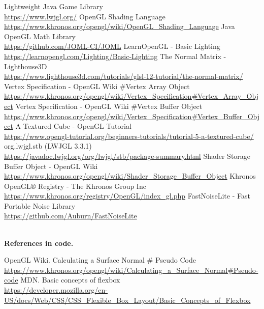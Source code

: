 \documentclass{article}
\begin{document}
    \begin{thebibliography}{9}
        
        Lightweight Java Game Library \\
        \url{https://www.lwjgl.org/}
        OpenGL Shading Language \\
        \url{https://www.khronos.org/opengl/wiki/OpenGL_Shading_Language}
        Java OpenGL Math Library \\
        \url{https://github.com/JOML-CI/JOML}
        LearnOpenGL - Basic Lighting \\
        \url{https://learnopengl.com/Lighting/Basic-Lighting}
        The Normal Matrix - Lighthouse3D \\
        \url{https://www.lighthouse3d.com/tutorials/glsl-12-tutorial/the-normal-matrix/}
        Vertex Specification - OpenGL Wiki \#Vertex Array Object \\
        \url{https://www.khronos.org/opengl/wiki/Vertex_Specification#Vertex_Array_Object}
        Vertex Specification - OpenGL Wiki \#Vertex Buffer Object \\
        \url{https://www.khronos.org/opengl/wiki/Vertex_Specification#Vertex_Buffer_Object}
        A Textured Cube - OpenGL Tutorial \\
        \url{https://www.opengl-tutorial.org/beginners-tutorials/tutorial-5-a-textured-cube/}
        org.lwjgl.stb (LWJGL 3.3.1) \\
        \url{https://javadoc.lwjgl.org/org/lwjgl/stb/package-summary.html}
        Shader Storage Buffer Object - OpenGL Wiki \\
        \url{https://www.khronos.org/opengl/wiki/Shader_Storage_Buffer_Object}
        Khronos OpenGL® Registry - The Khronos Group Inc \\
        \url{https://www.khronos.org/registry/OpenGL/index_gl.php}
        FastNoiseLite - Fast Portable Noise Library\\
        \url{https://github.com/Auburn/FastNoiseLite}

        \textbf{\\ References in code.}

         OpenGL Wiki. Calculating a Surface Normal \# Pseudo Code \\
        \url{https://www.khronos.org/opengl/wiki/Calculating_a_Surface_Normal#Pseudo-code}
         MDN. Basic concepts of flexbox \\
        \url{https://developer.mozilla.org/en-US/docs/Web/CSS/CSS_Flexible_Box_Layout/Basic_Concepts_of_Flexbox}


\end{thebibliography}
\end{document}
